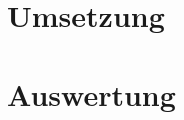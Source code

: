 \documentclass[
  12pt,
  headsepline,
  headings=normal,
  toc=bibliography,
  toc=listof
]{scrreport}
\begin{document}

\tableofcontents
\newpage

\chapter{Umsetzung}
\chapter{Auswertung}

\newpage
\listoffigures
\listoftables
\printbibliography
\end{document}
